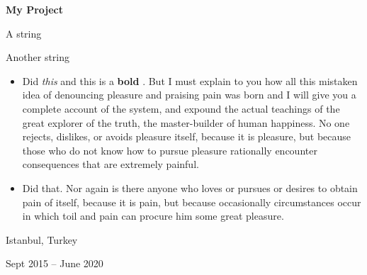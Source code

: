 \documentclass[10pt, letterpaper]{article}
\newenvironment{summary}{
    \begin{description}[
        topsep=0.10 cm,
        parsep=0.10 cm,
        partopsep=0pt,
        itemsep=0pt,
        leftmargin=0.4 cm + 10pt
    ]
}{
    \end{description}
} %
\newenvironment{highlights}{
    \begin{itemize}[
        topsep=0.10 cm,
        parsep=0.10 cm,
        partopsep=0pt,
        itemsep=0pt,
        leftmargin=0.4 cm + 10pt
    ]
}{
    \end{itemize}
} %
\newenvironment{twocolentry}[2][]{
    \onecolentry
    \def\secondColumn{#2}
    \setcolumnwidth{\fill, 4.5 cm}
    \begin{paracol}{2}
}{
    \switchcolumn \raggedleft \secondColumn
    \end{paracol}
    \endonecolentry
} %
\let\hrefWithoutArrow\href
\renewcommand{\href}[2]{\hrefWithoutArrow{#1}{\ifthenelse{\equal{#2}{}}{ }{#2 }\raisebox{.15ex}{\footnotesize \faExternalLink*}}}
\begin{document}
        \vspace{0.2 cm}

        \begin{twocolentry}{
            Istanbul, Turkey

        Sept 2015 – June 2020
        }
            \textbf{My Project}
            \begin{summary}
                \item A string
                \item Another string
            \end{summary}
            \begin{highlights}
                \item Did \textit{this} and this is a \textbf{bold} \href{https://example.com}{link}. But I must explain to you how all this mistaken idea of denouncing pleasure and praising pain was born and I will give you a complete account of the system, and expound the actual teachings of the great explorer of the truth, the master-builder of human happiness. No one rejects, dislikes, or avoids pleasure itself, because it is pleasure, but because those who do not know how to pursue pleasure rationally encounter consequences that are extremely painful.
                \item Did that. Nor again is there anyone who loves or pursues or desires to obtain pain of itself, because it is pain, but because occasionally circumstances occur in which toil and pain can procure him some great pleasure.
            \end{highlights}
        \end{twocolentry}


        \vspace{0.2 cm}
\end{document}
